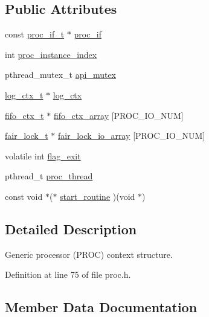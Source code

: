 \subsection*{Public Attributes}
\begin{DoxyCompactItemize}
\item 
const \hyperlink{proc_8h_a679816cf30e0b7a8f3e7464e67a6a844}{proc\+\_\+if\+\_\+t} $\ast$ \hyperlink{structproc__ctx__s_ae63f720fef21f807ed42fe76806140f6}{proc\+\_\+if}
\item 
int \hyperlink{structproc__ctx__s_a3912d4b5eaffcdaefa00f149ca4a8c63}{proc\+\_\+instance\+\_\+index}
\item 
pthread\+\_\+mutex\+\_\+t \hyperlink{structproc__ctx__s_aea90c57d9b0a303b638a51ce7efa9a1e}{api\+\_\+mutex}
\item 
\hyperlink{structlog__ctx__s}{log\+\_\+ctx\+\_\+t} $\ast$ \hyperlink{structproc__ctx__s_a7c58dee78b4d7834e4c2fe430cd267d5}{log\+\_\+ctx}
\item 
\hyperlink{structfifo__ctx__s}{fifo\+\_\+ctx\+\_\+t} $\ast$ \hyperlink{structproc__ctx__s_a3b71d039235f439a87d9ec7d7b5b5549}{fifo\+\_\+ctx\+\_\+array} \mbox{[}P\+R\+O\+C\+\_\+\+I\+O\+\_\+\+N\+UM\mbox{]}
\item 
\hyperlink{structfair__lock__s}{fair\+\_\+lock\+\_\+t} $\ast$ \hyperlink{structproc__ctx__s_a6529e1ba97566c429d658e121bb604bb}{fair\+\_\+lock\+\_\+io\+\_\+array} \mbox{[}P\+R\+O\+C\+\_\+\+I\+O\+\_\+\+N\+UM\mbox{]}
\item 
volatile int \hyperlink{structproc__ctx__s_a86a21b28f6c41f7a9a4cc9586f782d68}{flag\+\_\+exit}
\item 
pthread\+\_\+t \hyperlink{structproc__ctx__s_a09ad60355584215cfeb4d5589ee390b9}{proc\+\_\+thread}
\item 
const void $\ast$($\ast$ \hyperlink{structproc__ctx__s_a1149ce1c28aae8e553c85125e30be661}{start\+\_\+routine} )(void $\ast$)
\end{DoxyCompactItemize}


\subsection{Detailed Description}
Generic processor (P\+R\+OC) context structure. 

Definition at line 75 of file proc.\+h.



\subsection{Member Data Documentation}
